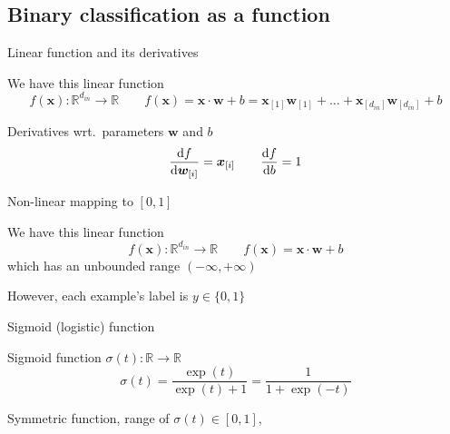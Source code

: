 \documentclass[12pt,aspectratio=169,handout]{beamer}
\begin{document}
\subsection{Binary classification as a function}

\begin{frame}{Linear function and its derivatives}
	
We have this linear function
$$f(\bm{x}) : \mathbb{R}^{d_{in}} \to \mathbb{R} \qquad
f(\bm{x}) = \bm{x} \cdot \bm{w} + b = \bm{x}_{[1]} \bm{w}_{[1]} + \ldots + \bm{x}_{[d_{in}]} \bm{w}_{[d_{in}]} + b $$

\begin{block}{Derivatives wrt.\ parameters $\bm{w}$ and $b$}
$$
\dv{f}{\bm{w}_{[i]}} = \bm{x}_{[i]} \qquad \dv{f}{b} = 1
$$
\end{block}


\end{frame}


\begin{frame}{Non-linear mapping to $[0, 1]$}

We have this linear function
$$f(\bm{x}) : \mathbb{R}^{d_{in}} \to \mathbb{R} \qquad
f(\bm{x}) = \bm{x} \cdot \bm{w} + b$$
which has an unbounded range $(-\infty, +\infty)$

\bigskip

However, each example's label is $y \in \{0, 1\}$

\end{frame}


\begin{frame}{Sigmoid (logistic) function}

\begin{block}{Sigmoid function $\sigma(t) : \mathbb{R} \to \mathbb{R}$}
	$$
	\sigma(t) = \frac{\exp(t)}{\exp(t) + 1} = \frac{1}{1 + \exp(-t)}
	$$
\end{block}


\begin{figure}
\end{figure}

Symmetric function, range of $\sigma(t) \in [0, 1]$, 

	
\end{frame}
\end{document}
